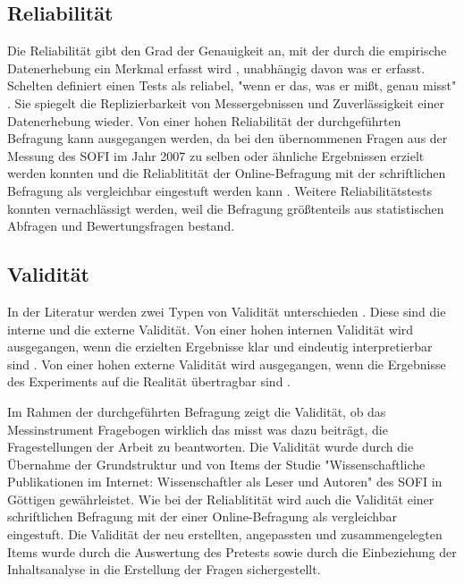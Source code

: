 \subsection{Reliabilität}

Die Reliabilität gibt den Grad der Genauigkeit an, mit der durch die empirische Datenerhebung ein Merkmal erfasst wird \cite{rost_2004_lehrbuch}, unabhängig davon was er erfasst. Schelten definiert einen Tests als reliabel, "wenn er das, was er mißt, genau misst" \cite{schelten_1997_testbeurteilung}.  Sie spiegelt die Replizierbarkeit von Messergebnissen und Zuverlässigkeit einer Datenerhebung wieder. Von einer hohen Reliabilität der durchgeführten Befragung kann ausgegangen werden, da bei den übernommenen Fragen aus der Messung des SOFI im Jahr 2007 zu selben oder ähnliche Ergebnissen erzielt werden konnten und die Reliablitität der Online-Befragung mit der schriftlichen Befragung als vergleichbar eingestuft werden kann \cite{suchen_DOI_10.1007/978-3-663-10948-8_10}. Weitere Reliabilitätstests konnten vernachlässigt werden, weil die Befragung größtenteils aus statistischen Abfragen und Bewertungsfragen bestand.

\subsection{Validität}
In der Literatur werden zwei Typen von Validität unterschieden \cite{rost_2004_lehrbuch}. Diese sind die interne und die externe Validität. Von einer hohen internen Validität wird ausgegangen, wenn die erzielten Ergebnisse klar und eindeutig interpretierbar sind \cite{raab_2012_fragebogen}. Von einer hohen externe Validität wird ausgegangen, wenn die Ergebnisse des Experiments auf die Realität übertragbar sind \cite{bortz1995forschungsmethoden}.

Im Rahmen der durchgeführten Befragung zeigt die Validität, ob das Messinstrument Fragebogen wirklich das misst was dazu beiträgt, die Fragestellungen der Arbeit zu beantworten. Die Validität wurde durch die Übernahme der Grundstruktur und von Items der Studie "Wissenschaftliche Publikationen im Internet: Wissenschaftler als Leser und Autoren" des SOFI in Göttigen gewährleistet. Wie bei der Reliablitität wird auch die Validität einer schriftlichen Befragung mit der einer Online-Befragung als vergleichbar eingestuft. Die Validität der neu erstellten, angepassten  und zusammengelegten Items wurde durch die Auswertung des Pretests sowie durch die Einbeziehung der Inhaltsanalyse in die Erstellung der Fragen sichergestellt.

